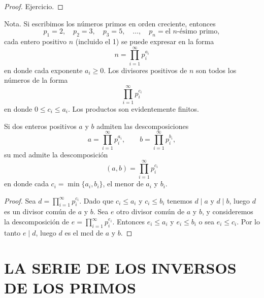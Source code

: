 \documentclass[12pt,a4paper]{book}
\begin{document}
    \begin{proof}
        Ejercicio.
    \end{proof}

    Nota. Si escribimos los números primos en orden creciente, entonces
    \begin{equation*}
        p_1=2,\quad p_2=3,\quad p_3=5,\quad\dots,\quad p_n=\text{el $n$-ésimo primo},
    \end{equation*}
    cada entero positivo $n$ (incluido el 1) se puede expresar en la forma
    \begin{equation*}
        n=\prod_{i=1}^{\infty}p_i^{a_i}
    \end{equation*}
    en donde cada exponente $a_i\geq0$. Los divisores positivos de $n$ son todos los números
    de la forma
    \begin{equation*}
        \prod_{i=1}^{\infty}p_i^{c_i}
    \end{equation*}
    en donde $0\leq c_i\leq a_i$. Los productos son evidentemente finitos.

    \begin{teorema}
        Si dos enteros positivos $a$ y $b$ admiten las descomposiciones
        \begin{equation*}
            a=\prod_{i=1}^{\infty}p_i^{a_i},\qquad b=\prod_{i=1}^{\infty}p_i^{b_i},
        \end{equation*}
        su mcd admite la descomposición
        \begin{equation*}
            (a,b)=\prod_{i=1}^{\infty}p_i^{c_i}
        \end{equation*}
        en donde cada $c_i=\min\{a_i,b_i\}$, el menor de $a_i$ y $b_i$.
    \end{teorema}

    \begin{proof}
        Sea $d=\prod_{i=1}^{\infty}p_i^{c_i}$. Dado que $c_i\leq a_i$ y $c_i\leq b_i$ tenemos
        $d\mid a$ y $d\mid b$, luego $d$ es un divisor común de $a$ y $b$. Sea $e$ otro
        divisor común de $a$ y $b$, y consideremos la descomposición de
        $e=\prod_{i=1}^{\infty}p_i^{e_i}$. Entonces $e_i\leq a_i$ y $e_i\leq b_i$ o sea
        $e_i\leq c_i$. Por lo tanto $e\mid d$, luego $d$ es el mcd de $a$ y $b$.
    \end{proof}

    \section{LA SERIE DE LOS INVERSOS DE LOS PRIMOS}
\end{document}
